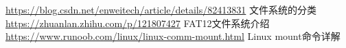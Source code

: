 \documentclass[12pt,a4paper,UTF8]{ctexart}
\begin{document}
\begin{thebibliography}{1}
 \href{https://blog.csdn.net/enweitech/article/details/82413831}
{https://blog.csdn.net/enweitech/article/details/82413831}
文件系统的分类
 \href{https://zhuanlan.zhihu.com/p/121807427}
{https://zhuanlan.zhihu.com/p/121807427}
FAT12文件系统介绍
 \href{https://www.runoob.com/linux/linux-comm-mount.html}
{https://www.runoob.com/linux/linux-comm-mount.html}
Linux mount命令详解
\end{thebibliography}
\end{document}
